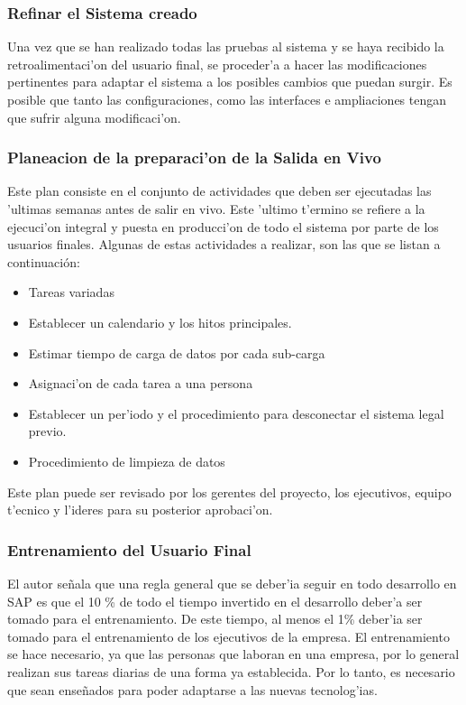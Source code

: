 \subsubsection*{Refinar el Sistema creado}
	Una vez que se han realizado todas las pruebas al sistema y se haya recibido la retroalimentaci'on del usuario final, se proceder'a a hacer las modificaciones pertinentes para adaptar el sistema a los posibles cambios que puedan surgir. Es posible que tanto las configuraciones, como las interfaces e ampliaciones tengan que sufrir alguna modificaci'on.
	 
\subsubsection*{Planeacion de la preparaci'on de la Salida en Vivo}
Este plan consiste en el conjunto de actividades que deben ser ejecutadas las 'ultimas semanas antes de salir en vivo. Este 'ultimo t'ermino se refiere a la ejecuci'on integral y puesta en producci'on de todo el sistema por parte de los usuarios finales. 
\newline
\newline
	Algunas de estas actividades a realizar, son las que se listan a continuación:
\begin{itemize}
\item Tareas variadas
\item Establecer un calendario y los hitos principales.
\item Estimar tiempo de carga de datos por cada sub-carga
\item Asignaci'on de cada tarea a una persona
\item Establecer un per'iodo y el procedimiento para desconectar el sistema legal previo.
\item Procedimiento de limpieza de datos
\end{itemize}
	Este plan puede ser revisado por los gerentes del proyecto, los ejecutivos, equipo t'ecnico y l'ideres para su posterior aprobaci'on. 
	
\subsubsection*{Entrenamiento del Usuario Final}
	El autor se\~nala que una regla general que se deber'ia seguir en todo desarrollo en SAP es que el 10 \% de todo el tiempo invertido en el desarrollo deber'a ser tomado para el entrenamiento. De este tiempo, al menos el 1\% deber'ia ser tomado para el entrenamiento de los ejecutivos de la empresa. 
\newline
\newline
\indent El entrenamiento se hace necesario, ya que las personas que laboran en una empresa, por lo general realizan sus tareas diarias de una forma ya establecida. Por lo tanto, es necesario que sean ense\~nados para poder adaptarse a las nuevas tecnolog'ias. 
	

